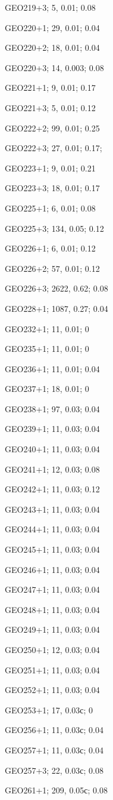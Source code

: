 GEO219+3; 5, 0.01; 0.08

GEO220+1; 29, 0.01; 0.04

GEO220+2; 18, 0.01; 0.04

GEO220+3; 14, 0.003; 0.08

GEO221+1; 9, 0.01; 0.17

GEO221+3; 5, 0.01; 0.12

GEO222+2; 99, 0.01; 0.25

GEO222+3; 27, 0.01; 0.17;

GEO223+1; 9, 0.01; 0.21

GEO223+3; 18, 0.01; 0.17

GEO225+1; 6, 0.01; 0.08

GEO225+3; 134, 0.05; 0.12

GEO226+1; 6, 0.01; 0.12

GEO226+2; 57, 0.01; 0.12

GEO226+3; 2622, 0.62; 0.08

GEO228+1; 1087, 0.27; 0.04

GEO232+1; 11, 0.01; 0

GEO235+1; 11, 0.01; 0

GEO236+1; 11, 0.01; 0.04

GEO237+1; 18, 0.01; 0

GEO238+1; 97, 0.03; 0.04

GEO239+1; 11, 0.03; 0.04

GEO240+1; 11, 0.03; 0.04

GEO241+1; 12, 0.03; 0.08

GEO242+1; 11, 0.03; 0.12

GEO243+1; 11, 0.03; 0.04

GEO244+1; 11, 0.03; 0.04

GEO245+1; 11, 0.03; 0.04

GEO246+1; 11, 0.03; 0.04

GEO247+1; 11, 0.03; 0.04

GEO248+1; 11, 0.03; 0.04

GEO249+1; 11, 0.03; 0.04

GEO250+1; 12, 0.03; 0.04

GEO251+1; 11, 0.03; 0.04

GEO252+1; 11, 0.03; 0.04

GEO253+1; 17, 0.03с; 0

GEO256+1; 11, 0.03с; 0.04

GEO257+1; 11, 0.03с; 0.04

GEO257+3; 22, 0.03с; 0.08

GEO261+1; 209, 0.05с; 0.08

